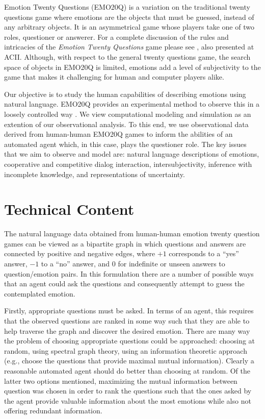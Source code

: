 \documentclass[a4paper]{llncs}
\begin{document}
Emotion Twenty Questions (EMO20Q) is a variation on the traditional twenty
questions game where emotions are the objects that must be guessed, instead of
any arbitrary objects.  It is an asymmetrical game whose players take one of
two roles, questioner or answerer. For a complete discussion of the rules and
intricacies of the \emph{Emotion Twenty Questions} game please see
\cite{Kazemzadeh2011a}, also presented at ACII.  Although, with respect to
the general twenty questions game, the search space of objects in EMO20Q is
limited, emotions add a level of subjectivity to the game that makes it
challenging for human and computer players alike.

Our objective is to study the human capabilities of describing emotions using
natural language.  EMO20Q provides an experimental method to observe this in a
loosely controlled way \cite{Kazemzadeh2011a}.  We view computational
modeling and simulation as an extention of our observational analysis.  To
this end, we use observational data derived from human-human EMO20Q games to
inform the abilities of an automated agent which, in this case, plays the
questioner role.  The key issues that we aim to observe and model are: natural
language descriptions of emotions, cooperative and competitive dialog
interaction, intersubjectivity, inference with incomplete knowledge, and
representations of uncertainty.

\section{Technical Content}

The natural language data obtained from human-human emotion twenty
question games can be viewed as a bipartite graph in which questions and
answers are connected by positive and negative edges, where $+1$ corresponds
to a ``yes'' answer, $-1$ to a ``no'' answer, and 0 for indefinite or unseen
answers to question/emotion pairs.  In this formulation there are a number of
possible ways that an agent could ask the questions and consequently attempt
to guess the contemplated emotion.

Firstly, appropriate questions must be asked.  In terms of an agent, this
requires that the observed questions are ranked in some way such that they are
able to help traverse the graph and discover the desired emotion.  There are
many way the problem of choosing appropriate questions could be approached:
choosing at random, using spectral graph theory, using an information
theoretic approach (e.g., choose the questions that provide maximal mutual
information).  Clearly a reasonable automated agent should do better than
choosing at random.  Of the latter two options mentioned, maximizing the mutual
information between question was chosen in order to rank the questions such
that the ones asked by the agent provide valuable information about the most
emotions while also not offering redundant information.  
\end{document}

